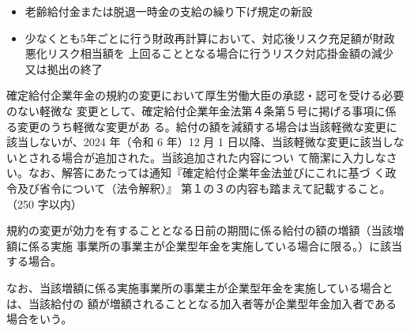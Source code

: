 \begin{answerbox}
 \begin{itemize}
  \item 老齢給付金または脱退一時金の支給の繰り下げ規定の新設
  \item 少なくとも5年ごとに行う財政再計算において、対応後リスク充足額が財政悪化リスク相当額を
    上回ることとなる場合に行うリスク対応掛金額の減少又は拠出の終了
 \end{itemize}
\end{answerbox}

\begin{shortanswer}[年金1 \ 2024 \ 問題2(1)ウ]
確定給付企業年金の規約の変更において厚生労働大臣の承認・認可を受ける必要のない軽微な
変更として、確定給付企業年金法第４条第５号に掲げる事項に係る変更のうち軽微な変更があ
る。給付の額を減額する場合は当該軽微な変更に該当しないが、2024 年（令和 6 年）12 月 1
日以降、当該軽微な変更に該当しないとされる場合が追加された。当該追加された内容につい
て簡潔に入力しなさい。なお、解答にあたっては通知『確定給付企業年金法並びにこれに基づ
く政令及び省令について（法令解釈）』 第１の３の内容も踏まえて記載すること。 （250 字以内）
\end{shortanswer}


\begin{answerbox}
規約の変更が効力を有することとなる日前の期間に係る給付の額の増額（当該増額に係る実施
事業所の事業主が企業型年金を実施している場合に限る。）に該当する場合。

なお、当該増額に係る実施事業所の事業主が企業型年金を実施している場合とは、当該給付の
額が増額されることとなる加入者等が企業型年金加入者である場合をいう。
\end{answerbox}

